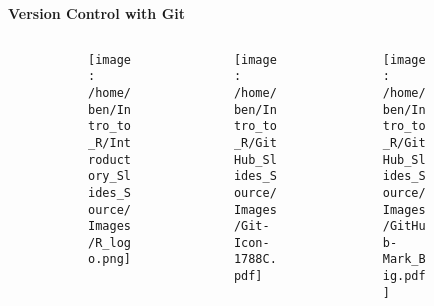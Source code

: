 \documentclass[xcolor=dvipsnames]{beamer}
\begin{document}





\begin{frame} %
\begin{center}
\textbf{\huge Version Control with Git}\\
\end{center}

\begin{figure}
\begin{columns}

\begin{column}{3.3cm}
\begin{center}
\begin{figure}
\texttt{[image: /home/ben/Intro\_to\_R/Introductory\_Slides\_Source/Images/R\_logo.png]}
\end{figure}
\end{center}
\end{column} 

\begin{column}{3.3cm}
\begin{center}
\begin{figure}
\texttt{[image: /home/ben/Intro\_to\_R/GitHub\_Slides\_Source/Images/Git-Icon-1788C.pdf]}
\end{figure}
\end{center}
\end{column} 

\begin{column}{3.3cm}
\begin{center}
\begin{figure}
\texttt{[image: /home/ben/Intro\_to\_R/GitHub\_Slides\_Source/Images/GitHub-Mark\_Big.pdf]}
\end{figure}
\end{center}
\end{column} 


\end{columns}
\end{figure}
\end{frame}
\end{document}
